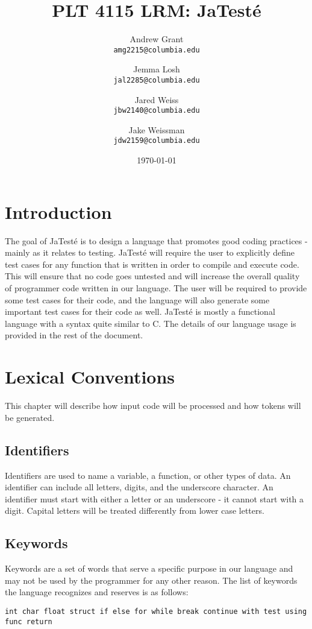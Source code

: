\documentclass{article}
\title{PLT 4115 LRM: \textbf{JaTest\'{e}}}
\author{
	Andrew Grant\\
	\texttt{amg2215@columbia.edu}
	\and
	Jemma Losh\\
	\texttt{jal2285@columbia.edu}
	\and
	Jared Weiss\\
	\texttt{jbw2140@columbia.edu}
	\and
	Jake Weissman\\
	\texttt{jdw2159@columbia.edu}
}
\date{\today}
\begin{document}
\maketitle

\section{Introduction}
The goal of JaTest\'{e} is to design a language that promotes good coding practices - mainly as it relates to testing.  JaTest\'{e} will require the user to explicitly define test cases for any function that is written in order to compile and execute code.  This will ensure that no code goes untested and will increase the overall quality of programmer code written in our language.  The user will be required to provide some test cases for their code, and the language will also generate some important test cases for their code as well.  JaTest\'{e} is mostly a functional language with a syntax quite similar to C.  The details of our language usage is provided in the rest of the document.

\section{Lexical Conventions}
This chapter will describe how input code will be processed and how tokens will be generated.

\subsection{Identifiers}
Identifiers are used to name a variable, a function, or other types of data.  An identifier can include all letters, digits, and the underscore character.  An identifier must start with either a letter or an underscore - it cannot start with a digit.  Capital letters will be treated differently from lower case letters.

\subsection{Keywords}
Keywords are a set of words that serve a specific purpose in our language and may not be used by the programmer for any other reason.  The list of keywords the language recognizes and reserves is as follows: 

\texttt{int char float struct if else for while break continue with test using func return}
\end{document}
